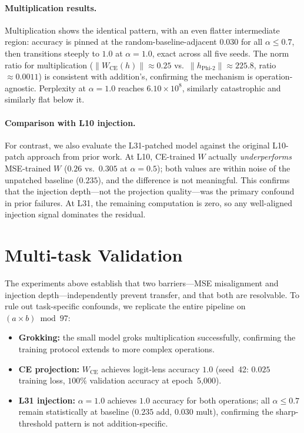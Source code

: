 \documentclass{article}
\begin{document}
\paragraph{Multiplication results.}
Multiplication shows the identical pattern, with an even flatter intermediate
region: accuracy is pinned at the random-baseline-adjacent $0.030$ for all
$\alpha \leq 0.7$, then transitions steeply to $1.0$ at $\alpha = 1.0$, exact across all
five seeds.  The norm ratio for multiplication
 ($\|W_{\text{CE}}(h)\| \approx 0.25$ vs.\ $\|h_{\text{Phi-2}}\| \approx 225.8$,
ratio $\approx 0.0011$) is consistent with addition's, confirming the
mechanism is operation-agnostic.  Perplexity at $\alpha = 1.0$ reaches
$6.10 \times 10^{8}$, similarly catastrophic and similarly flat below it.

\paragraph{Comparison with L10 injection.}
For contrast, we also evaluate the L31-patched model against the original
L10-patch approach from prior work.  At L10, CE-trained $W$ actually
\emph{underperforms} MSE-trained $W$ ($0.26$ vs.\ $0.305$ at $\alpha=0.5$);
both values are within noise of the unpatched baseline ($0.235$), and the
difference is not meaningful.
This confirms that the injection depth---not the projection quality---was the
primary confound in prior failures.  At L31, the remaining computation is
zero, so any well-aligned injection signal dominates the residual.

\section{Multi-task Validation}
\label{sec:multitask}

The experiments above establish that two barriers---MSE misalignment and
injection depth---independently prevent transfer, and that both are
resolvable.  To rule out task-specific confounds, we replicate the entire
pipeline on $(a \times b) \bmod 97$:

\begin{itemize}[nosep]
\item \textbf{Grokking:} the small model groks multiplication successfully,
  confirming the training protocol extends to more complex operations.
\item \textbf{CE projection:} $W_{\text{CE}}$ achieves logit-lens accuracy
  $1.0$ (seed~42: $0.025$ training loss, $100\%$ validation accuracy at
  epoch~5,000).
\item \textbf{L31 injection:} $\alpha=1.0$ achieves $1.0$ accuracy for both
  operations; all $\alpha \leq 0.7$ remain statistically at baseline
  ($0.235$ add, $0.030$ mult), confirming the sharp-threshold
  pattern is not addition-specific.
\end{itemize}
\end{document}
